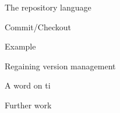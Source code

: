 \documentclass[ignorenonframetext,red]{beamer}
\begin{document}
\begin{frame}{The repository language}
  
\end{frame}

\begin{frame}{Commit/Checkout}
  
\end{frame}

\begin{frame}{Example}
  
\end{frame}

\begin{frame}{Regaining version management}
  
\end{frame}

\begin{frame}{A word on \textsf{ti}}
  
\end{frame}

\begin{frame}{Further work}
  
\end{frame}



\end{document}
